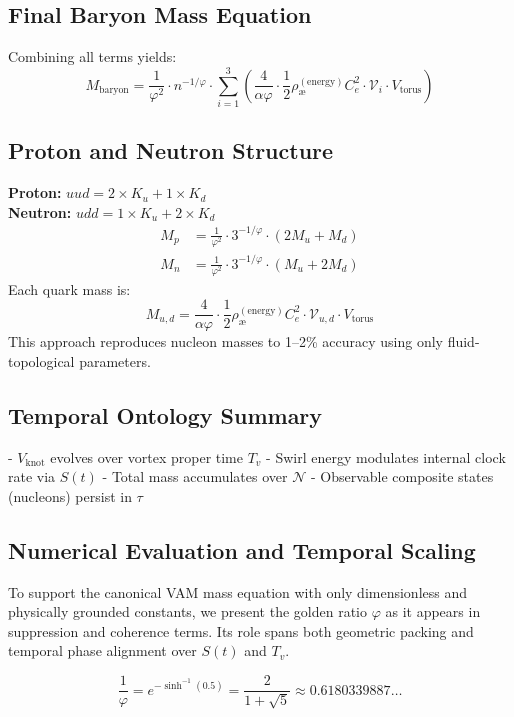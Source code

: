 \subsection{Final Baryon Mass Equation}
Combining all terms yields:
\[
\boxed{
M_{\text{baryon}} = \frac{1}{\varphi^2} \cdot n^{-1/\varphi} \cdot \sum_{i=1}^{3} \left( \frac{4}{\alpha \varphi} \cdot \frac{1}{2} \rho_\text{\ae}^{(\text{energy})} C_e^2 \cdot \mathcal{V}_i \cdot V_{\text{torus}} \right)
}
\]

\subsection{Proton and Neutron Structure}
\textbf{Proton:} $uud = 2\times K_u + 1\times K_d$ \\
\textbf{Neutron:} $udd = 1\times K_u + 2\times K_d$
\[
\begin{aligned}
M_p &= \frac{1}{\varphi^2} \cdot 3^{-1/\varphi} \cdot (2M_u + M_d) \\
M_n &= \frac{1}{\varphi^2} \cdot 3^{-1/\varphi} \cdot (M_u + 2M_d)
\end{aligned}
\]
Each quark mass is:
\[
M_{u,d} = \frac{4}{\alpha \varphi} \cdot \frac{1}{2} \rho_\text{\ae}^{(\text{energy})} C_e^2 \cdot \mathcal{V}_{u,d} \cdot V_{\text{torus}}
\]
This approach reproduces nucleon masses to 1–2\% accuracy using only fluid-topological parameters.

\subsection*{Temporal Ontology Summary}
- $V_{\text{knot}}$ evolves over vortex proper time $T_v$
- Swirl energy modulates internal clock rate via $S(t)$
- Total mass accumulates over $\mathcal{N}$
- Observable composite states (nucleons) persist in $\tau$


\subsection{Numerical Evaluation and Temporal Scaling}

To support the canonical VAM mass equation with only dimensionless and physically grounded constants, we present the golden ratio $\varphi$ as it appears in suppression and coherence terms. Its role spans both geometric packing and temporal phase alignment over $S(t)$ and $T_v$.

\[
\boxed{
\frac{1}{\varphi} = e^{-\sinh^{-1}(0.5)} = \frac{2}{1 + \sqrt{5}} \approx 0.6180339887\ldots
}
\]


